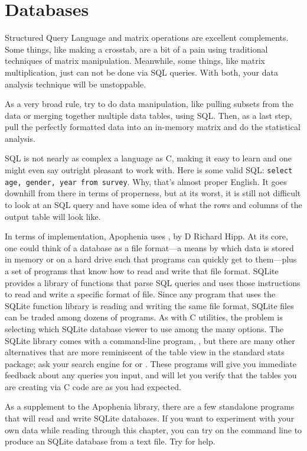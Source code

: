 \chapter{Databases} \label{sql}
\setsql %

Structured Query Language and matrix operations are excellent complements. Some things, like
making a crosstab, are a bit of a pain using traditional techniques of
matrix manipulation. Meanwhile, some things, like matrix multiplication,
just can not be done via SQL queries. With both, your data analysis
technique will be unstoppable.

As a very broad rule, try to do data manipulation, like pulling subsets
from the data or merging together multiple data tables, using SQL. Then,
as a last step, pull the perfectly formatted data into an in-memory matrix and
do the statistical analysis. 

SQL is not nearly as complex a language as C, making it easy to learn and
one might even say outright pleasant to work with. Here is some valid SQL:
{\tt select age, gender, year from survey}. Why, that's almost proper
English. It goes downhill from there in terms of properness, but at its
worst, it is still not difficult to look at an SQL query and have some
idea of what the rows and columns of the output table will look like.

In terms of implementation, Apophenia uses , by D Richard
Hipp. At its core, one could think of a database as a file format---a
means by which data is stored in memory or on a hard drive such that
programs can quickly get to them---plus a set of programs that know how
to read and write that file format. SQLite provides a library of functions
that parse SQL queries and uses those instructions to read and write
a specific format of file. Since any program that uses the SQLite
function library is reading and writing the same file format, SQLite
files can be traded among dozens of programs. As with C utilities,
the problem is selecting which SQLite database viewer to use among the
many options. The SQLite library comes with a command-line program,
, but there are many other alternatives that are more
reminiscent of the table view in the standard stats package; ask your
search engine for  or . These
programs will give you immediate feedback about any queries you input,
and will let you verify that the tables you are creating via C code are
as you had expected.

As a supplement to the Apophenia library, there are a few standalone
programs that will read and write SQLite databases. If you want to
experiment with your own data while reading through this chapter, you can
try  on the command line to produce an SQLite
database from a text file. Try  for help.

